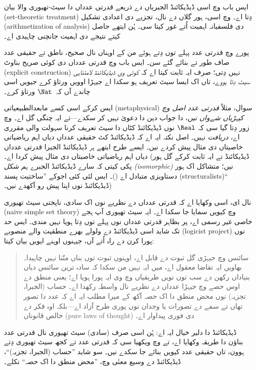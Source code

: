 \documentclass[../../../include/open-logic-section]{subfiles}
\begin{document}


ایس باب وچ اسی ڈیڈیکائنڈ الجبریاں دے ذریعے قدرتی عدداں دا سیٹ-تھیوری
والا بیان (set-theoretic treatment) دِتا اے۔ 
وچ اسی، ہور گلاں دے نال، تجزیے دی اعدادی تشکیل (arithmetization of
analysis) دی فلسفیانہ اہمیت اُتے غور کیتا سی۔ ہُن ایتھے حاصل کیتے
نتیجے دی اہمیت جانچنی چاہیدی اے۔

پورے  وچ قدرتی عدد پہلے توں دِتے ہوئے من کے
اوہناں نال صحیح، ناطق تے حقیقی عدد صاف طور تے بنائے گئے سن۔ ایس باب
وچ قدرتی عدداں دی کوئی صریح بناوٹ (explicit construction) نہیں دِتی؛
صرف ایہ ثابت کیتا اے کہ \emph{کوئی وی ڈیڈیکائنڈ لامتناہی سیٹ دِتا
ہووے}، تاں اک ایسا سیٹ تعریف ہو سکدا اے جیہڑا اوویں ورتاؤ کرے جیویں
اسی چاندے آں کہ~$\Nat$ ورتاؤ کرے۔

ایس کرکے اسی کسے مابعدالطبیعیاتی (metaphysical) سوال، مثلاً
\emph{قدرتی عدد اصل وچ کیہڑیاں شےواں نیں}، دا جواب دین دا دعویٰ نہیں
کر سکدے---تے ایہ چنگی گل اے۔  وچ زور دِتا
گیا سی کہ $\Real$ نوں ڈیڈیکائنڈ کٹاں دا سیٹ تعریف کرنا سہولت والی
مقرری اے، \emph{دریافت} نہیں۔ اصل نکتہ ایہ اے کہ ڈیڈیکائنڈ کٹ حقیقی
عدداں دیاں اہم ریاضیاتی خاصیتاں دی مثال پیش کردے نیں۔ ایسے طرح ایتھے
\emph{ہر} ڈیڈیکائنڈ الجبرا قدرتی عدداں دیاں اہم ریاضیاتی خاصیتاں دی
مثال پیش کردا اے۔ (ڈیڈیکائنڈ نے ایہ ثابت کرکے گل ہور پکی کیتی کہ سارے
ڈیڈیکائنڈ الجبرے \emph{ہم شکل (isomorphic)} نیں؛ متشاکل اک ہور
دستاویزی متبادل اے (\citeyear[Theorems
132--3]{Dedekind1888})۔ ایس لئی کئی اجوکے ”ساختیت پسند
(structuralists)“ ڈیڈیکائنڈ نوں اپنا پیش رو آکھدے نیں۔)

نال ای، اسی وکھایا اے کہ قدرتی عدداں دے نظریے نوں اک سادی، ناپختی
سیٹ تھیوری (naive simple set theory) وچ کیویں سمایا جا سکدا اے۔ ایہ
سیٹ تھیوری آپ ہجے خاصی غیر رسمی اے، پر بظاہر قدرتی عدداں نوں پہلے توں
دِتا ہویا نہیں مندی۔ ایس حد تک شاید اسی ڈیڈیکائنڈ دے ولولے بھرے
منطقیت والے منصوبے (logicist project) نوں پورا کرن دے راہ اُتے آں،
جیہنوں اوہنے ایویں بیان کیتا:
\begin{quote}
	سائنس وچ جیہڑی گل ثبوت دے قابل اے، اوہنوں ثبوت توں بناں منّنا نہیں
	چاہیدا۔ بھاویں ایہ تقاضا معقول اے، میں ایہ نہیں من سکدا کہ سادہ
	ترین سائنس دیاں بنیاداں رکھن دے سب توں نویں طریقیاں وچ وی ایہ پورا
	ہویا اے؛ یعنی منطق دے اوس حصے وچ جیہڑا عدداں دے نظریے نال واسطہ
	رکھدا اے۔ حساب (الجبرا، تجزیہ) نوں محض منطق دا اک حصہ آکھ کے میرا
	مطلب ایہ اے کہ عدد دا تصور تھاں تے سمے دے تصورات یا وجدان توں پوری
	طرح آزاد اے---بلکہ اوہ فکر دے خالص قانوناں (pure laws of thought)
	دی فوری پیداوار اے۔
	\citep[preface]{Dedekind1888}
\end{quote}
ڈیڈیکائنڈ دا دلیر خیال ایہ اے: ہُن اسی صرف (سادی) سیٹ تھیوری نال
قدرتی عدد بناؤن دا طریقہ وکھایا اے، تے  وچ
ویکھیا سی کہ قدرتی عدد تے کجھ سیٹ تھیوری دِتے ہوون، تاں حقیقی عدد
کیویں بنائے جا سکدے نیں۔ سو شاید ”حساب (الجبرا، تجزیہ)“، ڈیڈیکائنڈ
دے وسیع معنٰی وچ، ”محض منطق دا اک حصہ“ نکلے۔
\end{document}
